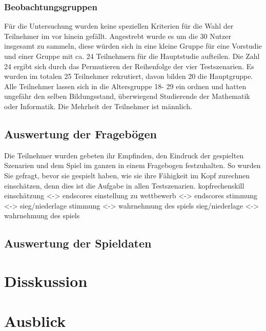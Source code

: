 \subsection{Beobachtungsgruppen}
Für die Untersuchung wurden keine speziellen Kriterien für die Wahl der Teilnehmer im vor hinein gefällt. Angestrebt wurde es um die 30 Nutzer insgesamt zu sammeln, diese würden sich in eine kleine Gruppe für eine Vorstudie und einer Gruppe mit ca. 24 Teilnehmern für die Hauptstudie aufteilen. Die Zahl 24 ergibt sich durch das Permutieren der Reihenfolge der vier Testszenarien. Es wurden im totalen 25 Teilnehmer rekrutiert, davon bilden 20 die Hauptgruppe. Alle Teilnehmer lassen sich in die Altersgruppe 18- 29 ein ordnen und hatten ungefähr den selben Bildungsstand, überwiegend Studierende der Mathematik oder Informatik. Die Mehrheit der Teilnehmer ist männlich.

\section{Auswertung der Fragebögen}
Die Teilnehmer wurden gebeten ihr Empfinden, den Eindruck der gespielten Szenarien und dem Spiel im ganzen in einem Fragebogen festzuhalten. So wurden Sie gefragt, bevor sie gespielt haben, wie sie ihre Fähigkeit im Kopf zurechnen einschätzen, denn dies ist die Aufgabe in allen Testszenarien. 
\newline
kopfrechenskill einschätzung <-> endscores
einstellung zu wettbewerb <-> endscores
stimmung <-> sieg/niederlage
stimmung <-> wahrnehmung des spiels
sieg/niederlage <-> wahrnehmung des spiels
\section{Auswertung der Spieldaten}

\chapter{Disskussion}
\chapter{Ausblick}


\listoffigures



